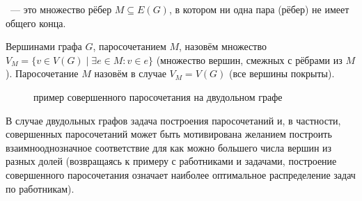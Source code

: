 \begin{definition}
    ~--- это множество рёбер $ M \subseteq E(G) $, в котором ни одна пара (рёбер) не имеет общего конца.
\end{definition}

\begin{definition}
    Вершинами графа $ G $,  паросочетанием $ M $, назовём множество $ V_M = \{ v \in V(G) \mid \exists e \in M: v \in e \} $
    (множество вершин, смежных с рёбрами из $ M $).
    Паросочетание $ M $ назовём  в случае $ V_M = V(G) $ (все вершины покрыты).
\end{definition}


\begin{figure}[ht!]
    \center
    \caption{пример совершенного паросочетания на двудольном графе}
    \label{fig:graphs:perfect_match}
\end{figure}


В случае двудольных графов задача построения паросочетаний и, в частности,
совершенных паросочетаний может быть мотивирована желанием построить взаимнооднозначное соответствие для как можно большего числа вершин из разных долей
(возвращаясь к примеру с работниками и задачами, построение совершенного паросочетания означает наиболее оптимальное распределение задач по работникам).

